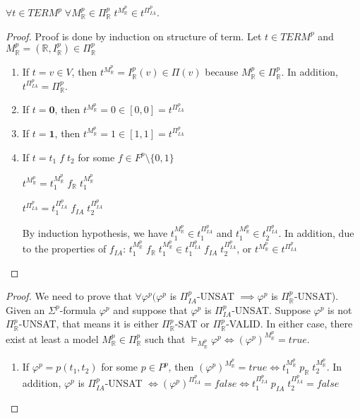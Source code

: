 \begin{lemma} \label{lemma:IA-OT}
$\forall t \in TERM^p \; \forall M^p_\mathbb{R} \in \Pi^p_\mathbb{R} \; t^{M^p_\mathbb{R}} \in t^{\Pi^p_{IA}}$.
\end{lemma}

\begin{proof}
Proof is done by induction on structure of term.
Let $t \in TERM^p$ and $M^p_\mathbb{R} = (\mathbb{R}, I^p_\mathbb{R}) \in \Pi^p_\mathbb{R}$
\begin{enumerate}
\item If $t = v \in V$, then $t^{M^p_\mathbb{R}} = I^p_\mathbb{R}(v) \in \Pi(v)$ because $M^p_\mathbb{R} \in \Pi^p_\mathbb{R}$. In addition, $t^{\Pi^p_{IA}} = \Pi^p_\mathbb{R}$.
\item If $t = \mathbf{0}$, then $t^{M^p_\mathbb{R}} = 0 \in [0, 0] = t^{\Pi^p_{IA}}$
\item If $t = \mathbf{1}$, then $t^{M^p_\mathbb{R}} = 1 \in [1, 1] = t^{\Pi^p_{IA}}$
\item If $t = t_1 \; f \; t_2$ for some $f \in F^p \setminus \{0, 1\}$

$t^{M^p_\mathbb{R}} = t_1^{M^p_\mathbb{R}} \; f_\mathbb{R} \; t_1^{M^p_\mathbb{R}}$

$t^{\Pi^p_{IA}} = t_1^{\Pi^p_{IA}} \; f_{IA} \; t_2^{\Pi^p_{IA}}$

By induction hypothesis, we have $t_1^{M^p_\mathbb{R}} \in t_1^{\Pi^p_{IA}}$ and $t_1^{M^p_\mathbb{R}} \in t_2^{\Pi^p_{IA}}$. In addition, due to the properties of $f_{IA}$: $t_1^{M^p_\mathbb{R}} \; f_\mathbb{R} \; t_1^{M^p_\mathbb{R}} \in t_1^{\Pi^p_{IA}} \; f_{IA} \; t_2^{\Pi^p_{IA}}$, or $t^{M^p_\mathbb{R}} \in t^{\Pi^p_{IA}}$ 
\end{enumerate}
\end{proof}

\begin{proof}
We need to prove that $\forall \varphi^p (\varphi^p$ is $\Pi^p_{IA}$-UNSAT $\implies \varphi^p$ is $\Pi^p_\mathbb{R}$-UNSAT). 
Given an $\Sigma^p$-formula $\varphi^p$ and suppose that $\varphi^p$ is $\Pi^p_{IA}$-UNSAT.
Suppose $\varphi^p$ is not $\Pi^p_\mathbb{R}$-UNSAT, that means it is either  $\Pi^p_\mathbb{R}$-SAT or  $\Pi^p_\mathbb{R}$-VALID. In either case, there exist at least a model $M^p_\mathbb{R} \in \Pi^p_\mathbb{R}$ such that $\models_{M^p_\mathbb{R}} \varphi^p \iff (\varphi^p)^{M^p_\mathbb{R}}= true$.
\begin{enumerate}
\item If $\varphi^p = p(t_1, t_2)$ for some $p \in P^p$, then $(\varphi^p)^{M^p_\mathbb{R}}= true \iff t_1^{M^p_\mathbb{R}} \; p_\mathbb{R} \; t_2^{M^p_\mathbb{R}}$. In addition, $\varphi^p$ is $\Pi^p_{IA}$-UNSAT $\iff (\varphi^p)^{\Pi^p_{IA}} = false \iff t_1^{\Pi^p_{IA}} \; p_{IA} \; t_2^{\Pi^p_{IA}} = false$
\end{enumerate}
\end{proof}

